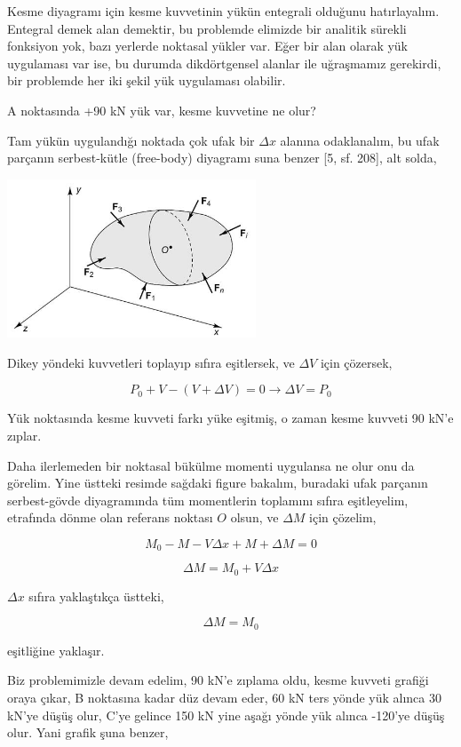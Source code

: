 \documentclass[12pt,fleqn]{article}\usepackage{../../common}
\begin{document}
Kesme diyagramı için kesme kuvvetinin yükün entegrali olduğunu hatırlayalım.
Entegral demek alan demektir, bu problemde elimizde bir analitik sürekli
fonksiyon yok, bazı yerlerde noktasal yükler var. Eğer bir alan olarak yük
uygulaması var ise, bu durumda dikdörtgensel alanlar ile uğraşmamız gerekirdi,
bir problemde her iki şekil yük uygulaması olabilir. 

A noktasında +90 kN yük var, kesme kuvvetine ne olur? 

Tam yükün uygulandığı noktada çok ufak bir $\Delta x$ alanına odaklanalım, bu
ufak parçanın serbest-kütle (free-body) diyagramı suna benzer [5, sf. 208], alt
solda,

\includegraphics[width=20em]{phy_020_strs_02_16.jpg}

Dikey yöndeki kuvvetleri toplayıp sıfıra eşitlersek, ve $\Delta V$ için
çözersek,

$$
P_0 + V - (V + \Delta V) = 0 \to \Delta V = P_0
$$

Yük noktasında kesme kuvveti farkı yüke eşitmiş, o zaman kesme kuvveti 90 kN'e
zıplar.

Daha ilerlemeden bir noktasal bükülme momenti uygulansa ne olur onu da
görelim. Yine üstteki resimde sağdaki figure bakalım, buradaki ufak parçanın
serbest-gövde diyagramında tüm momentlerin toplamını sıfıra eşitleyelim,
etrafında dönme olan referans noktası $O$ olsun, ve $\Delta M$ için çözelim,

$$
M_0 -M - V \Delta x + M + \Delta M = 0 
$$

$$
\Delta M = M_0 + V \Delta x
$$

$\Delta x$ sıfıra yaklaştıkça üstteki,

$$
\Delta M = M_0
$$

eşitliğine yaklaşır.

Biz problemimizle devam edelim, 90 kN'e zıplama oldu, kesme kuvveti grafiği
oraya çıkar, B noktasına kadar düz devam eder, 60 kN ters yönde yük alınca
30 kN'ye düşüş olur, C'ye gelince 150 kN yine aşağı yönde yük alınca -120'ye
düşüş olur. Yani grafik şuna benzer,
\end{document}
